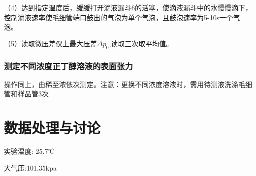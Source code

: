 \documentclass[hyperref,a4paper,UTF8]{ctexart}
\begin{document}
（4）达到指定温度后，缓缓打开滴液漏斗6的活塞，使滴液漏斗中的水慢慢滴下，控制滴液速率使毛细管端口鼓出的气泡为单个气泡，且鼓泡速率为5-10s一个气泡。


（5）读取微压差仪上最大压差$\Delta p_{0}$,读取三次取平均值。


\subsubsection{测定不同浓度正丁醇溶液的表面张力}
操作同上，由稀至浓依次测定。注意：更换不同浓度溶液时，需用待测液洗涤毛细管和样品管3次
\section{数据处理与讨论}
实验温度:  25.7℃         


大气压:101.35kpa


      
\end{document}
